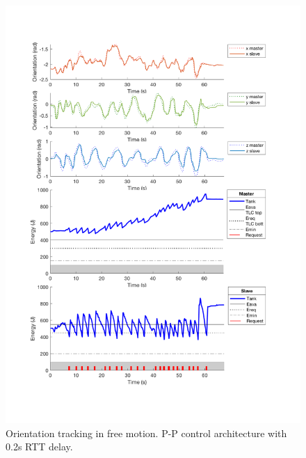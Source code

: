 \begin{center}
	\begin{figure}
		\includegraphics[width=\textwidth, keepaspectratio]{plots/ppDelay/Orientation.pdf}
		\caption{Orientation tracking in free motion. P-P control architecture with 0.2s RTT delay.}
		\label{graph:ppFreeDelay/Orientation}
	\end{figure}
\end{center}
